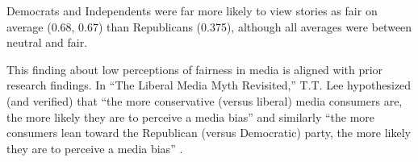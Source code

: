 Democrats and Independents were far more likely to view stories as fair on average (0.68, 0.67) than Republicans (0.375), although all averages were between neutral and fair.

This finding about low perceptions of fairness in media is aligned with prior research findings. In ``The Liberal Media Myth Revisited,'' T.T. Lee hypothesized (and verified) that ``the more conservative (versus liberal) media consumers are, the more likely they are to perceive a media bias'' and similarly ``the more consumers lean toward the Republican (versus Democratic) party, the more likely they are to perceive a media bias'' \cite{lee2005liberal}.


 


